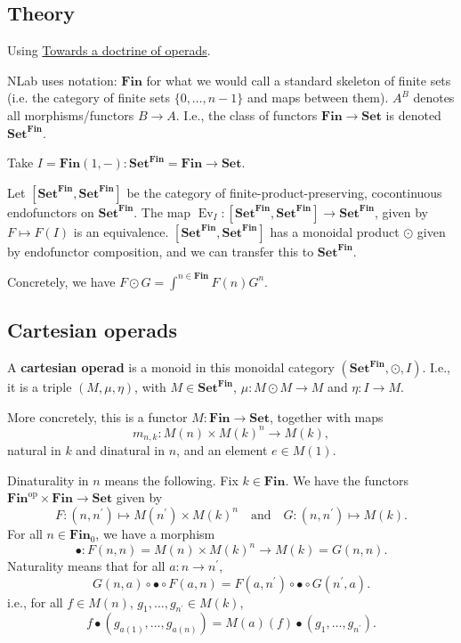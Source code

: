 \documentclass{amsbook}
\newcommand{\Catb}[1]{\mathbf{#1}}
\newcommand{\SET}{\Catb{Set}}
\newcommand{\FIN}{\Catb{Fin}}
\newcommand{\Ob}[1]{{#1}_0}
\newcommand{\Hom}[3]{{#1}(#2,#3)}
\newcommand{\op}[1]{\ensuremath{{#1}^\text{op}}}
\begin{document}
  \subsection{Theory}
  Using \href{https://ncatlab.org/toddtrimble/published/Towards+a+doctrine+of+operads}{Towards a doctrine of operads}.

  NLab uses notation: $ \FIN $ for what we would call a standard skeleton of finite sets (i.e. the category of finite sets $ \{ 0, \dots, n - 1 \} $ and maps between them). $ A^B $ denotes all morphisms/functors $ B \to A $. I.e., the class of functors $ \FIN \to \SET $ is denoted $ \SET^\FIN $.

  Take $ I = \Hom{\FIN}{1}{-}: \SET^\FIN = \FIN \to \SET $.
  
  Let $ [\SET^\FIN, \SET^\FIN] $ be the category of finite-product-preserving, cocontinuous endofunctors on $ \SET^\FIN $. The map $ \mathop{Ev}_I: [\SET^\FIN, \SET^\FIN] \to \SET^\FIN $, given by $ F \mapsto F(I) $ is an equivalence. $ [\SET^\FIN, \SET^\FIN] $ has a monoidal product $ \odot $ given by endofunctor composition, and we can transfer this to $ \SET^\FIN $.

  Concretely, we have $ F \odot G = \int^{n \in \FIN} F(n) G^n $.
  
  \subsection{Cartesian operads}
  A \textbf{cartesian operad} is a monoid in this monoidal category $ (\SET^{\FIN}, \odot, I) $. I.e., it is a triple $ (M, \mu, \eta) $, with $ M \in \SET^\FIN $, $ \mu: M \odot M \to M $ and $ \eta: I \to M $.

  More concretely, this is a functor $ M : \FIN \to \SET $, together with maps
  \[ m_{n, k}: M(n) \times M(k)^n \to M(k), \]
  natural in $ k $ and dinatural in $ n $, and an element $ e \in M(1) $.
  
  Dinaturality in $ n $ means the following. Fix $ k \in \FIN $. We have the functors $ \op \FIN \times \FIN \to \SET $ given by 
  \[ F: (n, n^\prime) \mapsto M(n^\prime) \times M(k)^{n} \quad \text{and} \quad G: (n, n^\prime) \mapsto M(k). \]
  For all $ n \in \Ob \FIN $, we have a morphism
  \[ \bullet: F(n, n) = M(n) \times M(k)^n \to M(k) = G(n, n). \]
  Naturality means that for all $ a: n \to n^\prime $,
  \[ G(n, a) \circ \bullet \circ F(a, n) = F(a, n^\prime) \circ \bullet \circ G(n^\prime, a). \]
  i.e., for all $ f \in M(n) $, $ g_1, \dots, g_{n^\prime} \in M(k) $,
  \[ f \bullet (g_{a(1)}, \dots, g_{a(n)}) = M(a)(f) \bullet (g_1, \dots, g_{n^\prime}). \]
\end{document}
